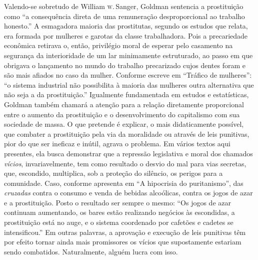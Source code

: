 Valendo-se sobretudo de William \textsc{w}.\,Sanger, Goldman sentencia a
prostituição como ``a consequência direta de uma remuneração
desproporcional ao trabalho honesto.'' A esmagadora maioria das
prostitutas, segundo os estudos que relata, era formada por mulheres e
garotas da classe trabalhadora. Pois a precariedade econômica retirava
o, então, privilégio moral de esperar pelo casamento na segurança da
interioridade de um lar minimamente estruturado, ao passo em que
obrigava o lançamento no mundo do trabalho precarizado cujos dentes
foram e são mais afiados no caso da mulher. Conforme escreve em
``Tráfico de mulheres'': ``o sistema industrial não possibilita à
maioria das mulheres outra alternativa que não seja a da prostituição.''
Igualmente fundamentada em estudos e estatísticas, Goldman também
chamará a atenção para a relação diretamente proporcional entre o
aumento da prostituição e o desenvolvimento do capitalismo com sua
sociedade de massa. O que pretende é explicar, o mais didaticamente
possível, que combater a prostituição pela via da moralidade ou através
de leis punitivas, pior do que ser ineficaz e inútil, agrava o problema.
Em vários textos aqui presentes, ela busca demonstrar que a repressão
legislativa e moral dos chamados \textit{vícios}, invariavelmente, tem como
resultado o desvio do mal para vias secretas, que, escondido,
multiplica, sob a proteção do silêncio, os perigos para a comunidade.
Caso, conforme apresenta em ``A hipocrisia do puritanismo'', das
\textit{cruzadas} contra o consumo e venda de bebidas alcoólicas, contra os
jogos de azar e a prostituição. Posto o resultado ser sempre o mesmo:
``Os jogos de azar continuam aumentando, os bares estão realizando
negócios às escondidas, a prostituição está no auge, e o sistema
coordenado por cafetões e cadetes se intensificou.'' Em outras palavras,
a aprovação e execução de leis punitivas têm por efeito tornar ainda
mais promissores os vícios que supostamente estariam sendo combatidos.
Naturalmente, alguém lucra com isso. 


